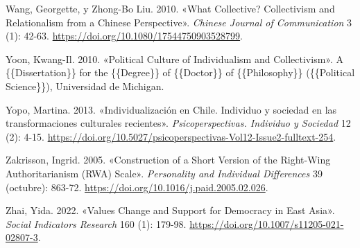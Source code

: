\documentclass[
  letterpaper,
  DIV=11,
  numbers=noendperiod]{scrartcl}
\newlength{\cslhangindent}
\newenvironment{CSLReferences}[2] %
 {\begin{list}{}{%
  \setlength{\itemindent}{0pt}
  \setlength{\leftmargin}{0pt}
  \setlength{\parsep}{0pt}
  \ifodd #1
   \setlength{\leftmargin}{\cslhangindent}
   \setlength{\itemindent}{-1\cslhangindent}
  \fi
  \setlength{\itemsep}{#2\baselineskip}}}
 {\end{list}}
\begin{document}
\begin{CSLReferences}{1}{0}
Wang, Georgette, y Zhong-Bo Liu. 2010. {«What Collective? {Collectivism}
and Relationalism from a {Chinese} Perspective»}. \emph{Chinese Journal
of Communication} 3 (1): 42-63.
\url{https://doi.org/10.1080/17544750903528799}.

Yoon, Kwang-Il. 2010. {«Political {Culture} of {Individualism} and
{Collectivism}»}. A \{\{Dissertation\}\} for the \{\{Degree\}\} of
\{\{Doctor\}\} of \{\{Philosophy\}\} (\{\{Political Science\}\}),
Universidad de Michigan.

Yopo, Martina. 2013. {«{Individualizaci{ó}n en Chile. Individuo y
sociedad en las transformaciones culturales recientes}»}.
\emph{Psicoperspectivas. Individuo y Sociedad} 12 (2): 4-15.
\url{https://doi.org/10.5027/psicoperspectivas-Vol12-Issue2-fulltext-254}.

Zakrisson, Ingrid. 2005. {«Construction of a Short Version of the
{Right-Wing Authoritarianism} ({RWA}) {Scale}»}. \emph{Personality and
Individual Differences} 39 (octubre): 863-72.
\url{https://doi.org/10.1016/j.paid.2005.02.026}.

Zhai, Yida. 2022. {«Values {Change} and {Support} for {Democracy} in
{East Asia}»}. \emph{Social Indicators Research} 160 (1): 179-98.
\url{https://doi.org/10.1007/s11205-021-02807-3}.

\end{CSLReferences}
\end{document}
